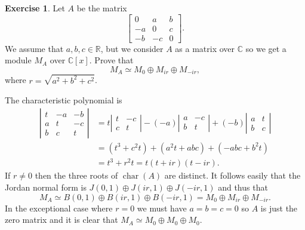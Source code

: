 \documentclass{amsart}
\newcommand{\bbm}       {\left[\begin{matrix}}
\newcommand{\ebm}       {\end{matrix}\right]}
\newcommand{\chr}       {\operatorname{char}}
\newcommand{\C}         {{\mathbb{C}}}
\newcommand{\R}         {{\mathbb{R}}}
\newcommand{\ip}[1]     {\langle #1\rangle}
\newcommand{\op}        {\oplus}
\renewcommand{\:}{\colon}
\theoremstyle{definition}
\newtheorem{exercise}{Exercise}[section]
\renewenvironment{solution}{\SolutionAtEnd}{\endSolutionAtEnd}
\begin{document}
\begin{exercise}
 Let $A$ be the matrix
 \[ \bbm 0 & a & b \\ -a & 0 & c \\ -b & -c & 0 \ebm. \]
 We assume that $a,b,c\in\R$, but we consider $A$ as a matrix over
 $\C$ so we get a module $M_A$ over $\C[x]$.  Prove that 
 \[ M_A \simeq M_0 \op M_{ir} \op M_{-ir}, \]
 where $r=\sqrt{a^2+b^2+c^2}$.  
\end{exercise}
\begin{solution}
 The characteristic polynomial is 
 \begin{align*}
  \left|\begin{array}{ccc} 
   t & -a & -b \\ a & t & -c \\ b & c & t 
  \end{array}\right| &= 
  t      \left|\begin{array}{cc} t & -c \\ c & t \end{array}\right| 
  - (-a) \left|\begin{array}{cc} a & -c \\ b & t \end{array}\right| 
  + (-b) \left|\begin{array}{cc} a &  t \\ b & c \end{array}\right| \\
  &= (t^3 + c^2t) + (a^2t + abc) + (-abc + b^2t) \\
  &= t^3 + r^2 t = t (t+ir)(t-ir).
 \end{align*}
 If $r\neq 0$ then the three roots of $\chr(A)$ are distinct.  It
 follows easily that the Jordan normal form is
 $J(0,1)\op J(ir,1)\op J(-ir,1)$ and thus that
 \[ M_A\simeq B(0,1)\op B(ir,1)\op B(-ir,1) =
    M_0\op M_{ir} \op M_{-ir}.
 \]
 In the exceptional case where $r=0$ we must have $a=b=c=0$ so $A$ is
 just the zero matrix and it is clear that
 $M_A\simeq M_0\op M_0\op M_0$. 
\end{solution}
\end{document}
